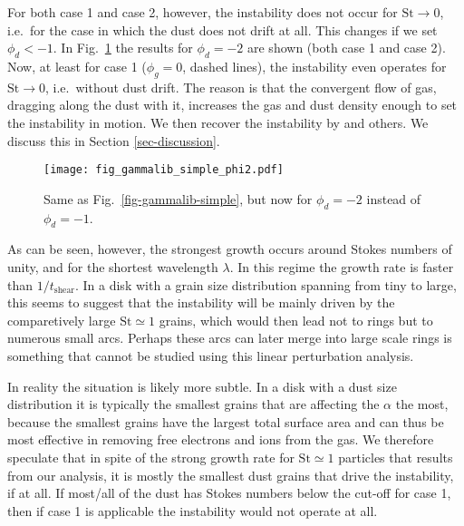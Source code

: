 \documentclass{aa}
\newcommand{\revised}[1]{{#1}}
\begin{document}
\revised{For both case 1 and case 2, however, the instability does not occur for
  $\mathrm{St}\rightarrow 0$, i.e.\ for the case in which the dust does not
  drift at all. This changes if we set $\phi_d<-1$. In
  Fig.~\ref{fig-gammalib-simple-phi2} the results for $\phi_d=-2$ are shown
  (both case 1 and case 2). Now, at least for case 1 ($\phi_g=0$, dashed lines),
  the instability even operates for $\mathrm{St}\rightarrow 0$, i.e.\ without
  dust drift. The reason is that the convergent flow of gas, dragging along the
  dust with it, increases the gas and dust density enough to set the instability
  in motion. We then recover the instability by \citet{2015ApJ...815...99H}
  and others. We discuss this in Section \ref{sec-discussion}. 
}

%
\begin{figure}
  \centerline{\texttt{[image: fig\_gammalib\_simple\_phi2.pdf]}}
  \caption{\label{fig-gammalib-simple-phi2}Same as Fig.~\ref{fig-gammalib-simple},
    but now for $\phi_d=-2$ instead of $\phi_d=-1$.}
\end{figure}
%

As can be seen, however, the strongest growth occurs around Stokes numbers of
unity, and for the shortest wavelength $\lambda$. In this regime the growth rate
is faster than $1/t_{\mathrm{shear}}$. In a disk with a grain size distribution
spanning from tiny to large, this seems to suggest that the instability will be
mainly driven by the comparetively large $\mathrm{St}\simeq 1$ grains, which
would then lead not to rings but to numerous small arcs. Perhaps these arcs
can later merge into large scale rings is something that cannot be studied
using this linear perturbation analysis.

In reality the situation is likely more subtle. In a disk with a dust size
distribution it is typically the smallest grains that are affecting
the $\alpha$ the most, because the smallest grains have the largest total
surface area and can thus be most effective in removing free electrons and
ions from the gas. We therefore speculate that in spite of the strong
growth rate for $\mathrm{St}\simeq 1$ particles that results from our
analysis, it is mostly the smallest dust grains that drive the instability,
if at all. If most/all of the dust has Stokes numbers below the cut-off
for case 1, then if case 1 is applicable the instability would not operate
at all.
\end{document}
